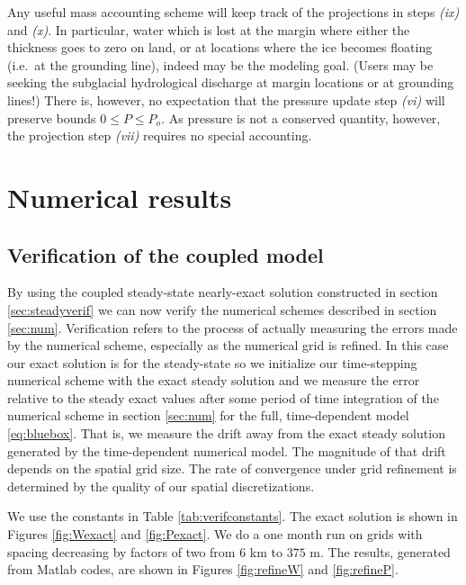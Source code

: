 \documentclass[11pt,final]{amsart}%
\begin{document}
\bigskip\medskip
Any useful mass accounting scheme will keep track of the projections in steps \emph{(ix)} and \emph{(x)}.  In particular, water which is lost at the margin where either the thickness goes to zero on land, or at locations where the ice becomes floating (i.e.~at the grounding line), indeed may be the modeling goal.  (Users may be seeking the subglacial hydrological discharge at margin locations or at grounding lines!)  There is, however, no expectation that the pressure update step \emph{(vi)} will preserve bounds $0\le P \le P_o$.  As pressure is not a conserved quantity, however, the projection step \emph{(vii)} requires no special accounting.



\section{Numerical results}  \label{sec:results}

\subsection*{Verification of the coupled model}  By using the coupled steady-state nearly-exact solution constructed in section \ref{sec:steadyverif} we can now verify the numerical schemes described in section \ref{sec:num}.  Verification refers to the process of actually measuring the errors made by the numerical scheme, especially as the numerical grid is refined.  In this case our exact solution is for the steady-state so we initialize our time-stepping numerical scheme with the exact steady solution and we measure the error relative to the steady exact values after some period of time integration of the numerical scheme in section \ref{sec:num} for the full, time-dependent model \eqref{eq:bluebox}.  That is, we measure the drift away from the exact steady solution generated by the time-dependent numerical model.  The magnitude of that drift depends on the spatial grid size.  The rate of convergence under grid refinement is determined by the quality of our spatial discretizations.

We use the constants in Table \ref{tab:verifconstants}.  The exact solution is shown in Figures \ref{fig:Wexact} and \ref{fig:Pexact}.  We do a one month run on grids with spacing decreasing by factors of two from $6$ km to $375$ m.  The results, generated from Matlab codes, are shown in Figures \ref{fig:refineW} and \ref{fig:refineP}.
\end{document}
